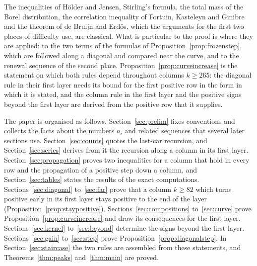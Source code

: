 \documentclass{amsart}
\theoremstyle{definition}
\theoremstyle{remark}
\numberwithin{equation}{section}
\begin{document}
The inequalities of H\"older and Jensen, Stirling's formula, the total mass
of the Borel distribution, the correlation
inequality of Fortuin, Kasteleyn and Ginibre and the theorem of de Bruijn
and Erd\H{o}s, which the arguments for the first two places of difficulty
use, are classical. What is particular to the proof is where they are
applied: to the two terms of the formulas of
Proposition~\ref{prop:frozenstep}, which are followed along a diagonal and
compared near the curve, and to the renewal sequence of the second place.
Proposition~\ref{prop:curveincrease} is the
statement on which both rules depend throughout columns $k\ge265$: the
diagonal rule in their first layer needs its bound for the first positive
row in the form in which it is stated, and the column rule in the first
layer and the positive signs beyond the first layer are derived from the
positive row that it supplies.

The paper is organised as follows. Section~\ref{sec:prelim} fixes
conventions and collects the facts about the numbers $a_i$ and related
sequences that several later sections use. Section~\ref{sec:counts}
quotes the last-car recursion, and Section~\ref{sec:series} derives from it the
recursion along a column in its first layer. Section~\ref{sec:propagation}
proves two inequalities for a column that hold in every row and the
propagation of a positive step down a column, and
Section~\ref{sec:tables} states the results of the exact computations.
Sections~\ref{sec:diagonal} to~\ref{sec:far} prove that a column $k\ge82$
which turns positive early in its first layer stays positive to the end of
the layer (Proposition~\ref{prop:staypositive}).
Sections~\ref{sec:compositions} to~\ref{sec:curve} prove
Proposition~\ref{prop:curveincrease} and draw its consequences for the first
layer. Sections~\ref{sec:kernel} to~\ref{sec:beyond} determine the signs
beyond the first layer. Sections~\ref{sec:gain} to~\ref{sec:step} prove
Proposition~\ref{prop:diagonalstep}. In Section~\ref{sec:staircase} the two
rules are assembled from these statements, and Theorems~\ref{thm:peaks}
and~\ref{thm:main} are proved.
\end{document}
